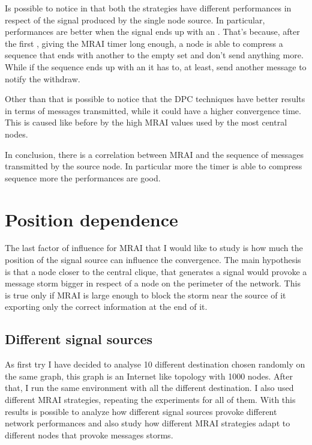 Is possible to notice in  that
both the strategies have different performances in respect of the signal 
produced by the single node source.
In particular, performances are better when the signal ends up with an .
That's because, after the first , giving the \ac{MRAI} timer long enough, 
a node is able to compress a sequence that ends with another  to the
empty set and don't send anything more.
While if the sequence ends up with an  it has to, at least, send another
message to notify the withdraw.

Other than that is possible to notice that the \ac{DPC} techniques have better
results in terms of messages transmitted, while it could have a higher 
convergence time.
This is caused like before by the high \ac{MRAI} values used by the most
central nodes.

In conclusion, there is a correlation between \ac{MRAI} and the sequence of messages
transmitted by the source node.
In particular more the timer is able to compress sequence more the performances
are good.

\section{Position dependence}
\label{sec:position_dependance}

The last factor of influence for \ac{MRAI} that I would like to study is how much
the position of the signal source can influence the convergence.
The main hypothesis is that a node closer to the central clique, that generates
a signal would provoke a message storm bigger in respect of a node on the perimeter
of the network.
This is true only if \ac{MRAI} is large enough to block the storm near the source
of it exporting only the correct information at the end of it.

\subsection{Different signal sources}
\label{subsec:different_destinations}

As first try I have decided to analyse \num{10} different destination chosen randomly
on the same graph, this graph is an Internet like topology with \num{1000} nodes.
After that, I run the same environment with all the different destination.
I also used different \ac{MRAI} strategies, repeating the experiments for all of
them.
With this results is possible to analyze how different signal sources provoke 
different network performances and also study how different \ac{MRAI} strategies
adapt to different nodes that provoke messages storms.

